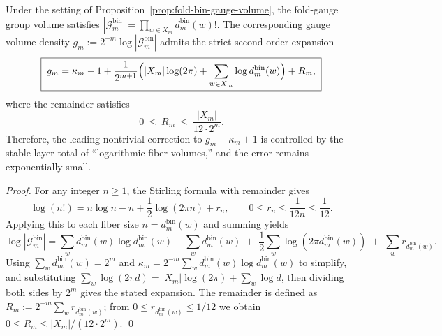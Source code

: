 \begin{theorem}\label{thm:fold-bin-gauge-volume-stirling-second-order}
Under the setting of Proposition~\ref{prop:fold-bin-gauge-volume}, the fold-gauge group volume satisfies
\(
|\mathcal{G}^{\mathrm{bin}}_m|=\prod_{w\in X_m} d^{\mathrm{bin}}_m(w)!
\).
The corresponding gauge volume density \(g_m:=2^{-m}\log|\mathcal{G}^{\mathrm{bin}}_m|\) admits the strict second-order expansion
\[
\boxed{\;
g_m
=\kappa_m-1+\frac{1}{2^{m+1}}\Bigl(|X_m|\log(2\pi)+\sum_{w\in X_m}\log d^{\mathrm{bin}}_m(w)\Bigr)+R_m,
\;}
\]
where the remainder satisfies
\[
\boxed{\;0\ \le\ R_m\ \le\ \frac{|X_m|}{12\cdot 2^m}.\;}
\]
Therefore, the leading nontrivial correction to \(g_m-\kappa_m+1\) is controlled by the stable-layer total of ``logarithmic fiber volumes,'' and the error remains exponentially small.
\end{theorem}
\begin{proof}
For any integer \(n\ge 1\), the Stirling formula with remainder gives
\[
\log(n!)=n\log n-n+\frac12\log(2\pi n)+r_n,
\qquad 0\le r_n\le \frac{1}{12n}\le \frac{1}{12}.
\]
Applying this to each fiber size \(n=d^{\mathrm{bin}}_m(w)\) and summing yields
\[
\log|\mathcal{G}^{\mathrm{bin}}_m|
=\sum_{w}d^{\mathrm{bin}}_m(w)\log d^{\mathrm{bin}}_m(w)-\sum_w d^{\mathrm{bin}}_m(w)
\;+\;\frac12\sum_w\log(2\pi d^{\mathrm{bin}}_m(w))
\;+\;\sum_w r_{d^{\mathrm{bin}}_m(w)}.
\]
Using \(\sum_w d^{\mathrm{bin}}_m(w)=2^m\) and \(\kappa_m=2^{-m}\sum_w d^{\mathrm{bin}}_m(w)\log d^{\mathrm{bin}}_m(w)\) to simplify, and substituting
\(
\sum_w \log(2\pi d)=|X_m|\log(2\pi)+\sum_w\log d
\),
then dividing both sides by \(2^m\) gives the stated expansion.
The remainder is defined as
\(
R_m:=2^{-m}\sum_w r_{d^{\mathrm{bin}}_m(w)}
\);
from \(0\le r_{d^{\mathrm{bin}}_m(w)}\le 1/12\) we obtain
\(
0\le R_m\le |X_m|/(12\cdot 2^m)
\).
\qed
\end{proof}
